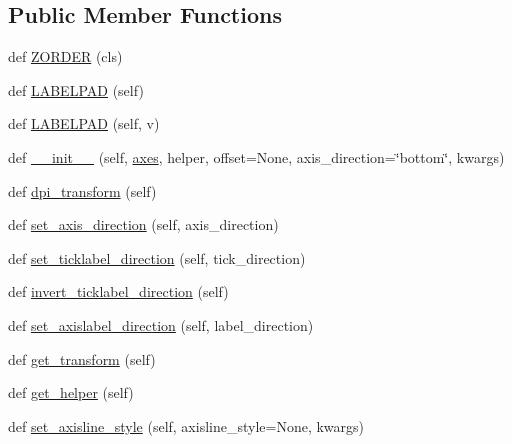 \subsection*{Public Member Functions}
\begin{DoxyCompactItemize}
\item 
def \hyperlink{classaxisartist_1_1axis__artist_1_1AxisArtist_a7d6da2889a43e27a099afb942c8443d6}{Z\+O\+R\+D\+ER} (cls)
\item 
def \hyperlink{classaxisartist_1_1axis__artist_1_1AxisArtist_a4c59accb6a7154dee73f4583350059ab}{L\+A\+B\+E\+L\+P\+AD} (self)
\item 
def \hyperlink{classaxisartist_1_1axis__artist_1_1AxisArtist_a793b281993a2f58f70dc72777f273c37}{L\+A\+B\+E\+L\+P\+AD} (self, v)
\item 
def \hyperlink{classaxisartist_1_1axis__artist_1_1AxisArtist_a34ca558944e8d059643c645d9a1da0a1}{\+\_\+\+\_\+init\+\_\+\+\_\+} (self, \hyperlink{classaxisartist_1_1axis__artist_1_1AxisArtist_af4afb04cb8a9572ce7e06c56f01d5096}{axes}, helper, offset=None, axis\+\_\+direction=\char`\"{}bottom\char`\"{}, kwargs)
\item 
def \hyperlink{classaxisartist_1_1axis__artist_1_1AxisArtist_a99919fdeef8d77c518158556fd515616}{dpi\+\_\+transform} (self)
\item 
def \hyperlink{classaxisartist_1_1axis__artist_1_1AxisArtist_a868eaeae59ec412a1240c5774a0fcb93}{set\+\_\+axis\+\_\+direction} (self, axis\+\_\+direction)
\item 
def \hyperlink{classaxisartist_1_1axis__artist_1_1AxisArtist_a5d206ba6246491f52afc3c542e937e05}{set\+\_\+ticklabel\+\_\+direction} (self, tick\+\_\+direction)
\item 
def \hyperlink{classaxisartist_1_1axis__artist_1_1AxisArtist_ae4c8993927ac195620f152110866cbce}{invert\+\_\+ticklabel\+\_\+direction} (self)
\item 
def \hyperlink{classaxisartist_1_1axis__artist_1_1AxisArtist_a2a300caa979172948ba691317616160d}{set\+\_\+axislabel\+\_\+direction} (self, label\+\_\+direction)
\item 
def \hyperlink{classaxisartist_1_1axis__artist_1_1AxisArtist_a38a9e7952762e64115248c81cf4db92d}{get\+\_\+transform} (self)
\item 
def \hyperlink{classaxisartist_1_1axis__artist_1_1AxisArtist_a57ba1b5273342d7aa509f69ea66fc5f3}{get\+\_\+helper} (self)
\item 
def \hyperlink{classaxisartist_1_1axis__artist_1_1AxisArtist_a6621db864785e5109c9050c0da00c5d6}{set\+\_\+axisline\+\_\+style} (self, axisline\+\_\+style=None, kwargs)

\end{DoxyCompactItemize}
